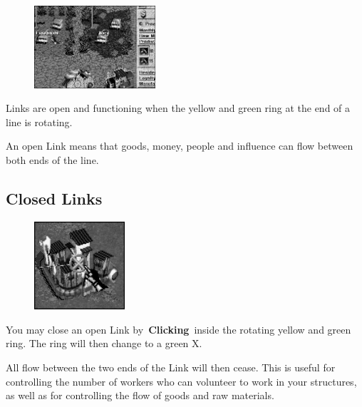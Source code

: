 \begin{figure}
	\vspace{-20pt}
	\begin{center}
		\includegraphics[width=0.4\textwidth]{Iopenlink}
	\end{center}
	\vspace{-20pt}
\end{figure}

Links are open and functioning when the yellow and green ring at the end of a line is rotating.

An open Link means that goods, money, people and influence can flow between both ends of the line.

\subsection{Closed Links}

\begin{figure}
	\vspace{-20pt}
	\begin{center}
		\includegraphics[width=0.3\textwidth]{Icloselink_fort}
	\end{center}
	\vspace{-20pt}
\end{figure}


You may close an open Link by \textbf{Clicking} inside the rotating yellow and green ring. The ring will then change to a green X.

All flow between the two ends of the Link will then cease. This is useful for controlling the number of workers who can volunteer to work in your structures, as well as for controlling the flow of goods and raw materials.

